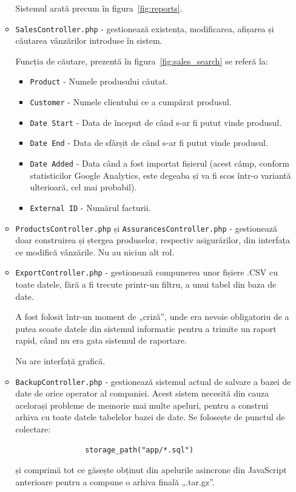\begin{itemize}
\begin{itemize}
				Sistemul arată precum în figura~\ref{fig:reports}.

				\item \verb|SalesController.php| - gestionează existența, modificarea, afișarea și căutarea vânzărilor introduse în sistem.

				Funcția de căutare, prezentă în figura~\ref{fig:sales_search} se referă la:
				\begin{itemize}
					\item \verb|Product| - Numele produsului căutat.
					\item \verb|Customer| - Numele clientului ce a cumpărat produsul.
					\item \verb|Date Start| - Data de început de când s-ar fi putut vinde produsul.
					\item \verb|Date End| - Data de sfârșit de când s-ar fi putut vinde produsul.
					\item \verb|Date Added| - Data când a fost importat fișierul (acest câmp, conform statisticilor Google Analytics, este degeaba și va fi scos într-o variantă ulterioară, cel mai probabil).
					\item \verb|External ID| - Numărul facturii.
				\end{itemize}
				\item \verb|ProductsController.php| și \verb|AssurancesController.php| - gestionează doar construirea și ștergea
					produselor, respectiv asigurărilor, din interfața ce modifică vânzările.
					Nu au niciun alt rol.
				\item \verb|ExportController.php| - gestionează compunerea unor fișiere .CSV cu toate datele, fără a fi trecute printr-un filtru, a unui tabel din baza de date.

				A fost folosit într-un moment de „criză”, unde era nevoie obligatoriu de a putea scoate datele din sistemul informatic pentru a trimite un raport rapid, când nu era gata sistemul de raportare.

				Nu are interfață grafică.

				\item \verb|BackupController.php| - gestionează sistemul actual de salvare a bazei de date de orice operator al companiei.
				Acest sistem necesită din cauza acelorași probleme de memorie mai multe apeluri, pentru a construi arhiva cu toate datele tabelelor bazei de date.
				Se folosește de punctul de colectare:
				\begin{verbatim}
				storage_path("app/*.sql")
				\end{verbatim}
				și comprimă tot ce găsește obținut din apelurile asincrone din JavaScript anterioare pentru a compune o arhiva finală „.tar.gz”.


\end{itemize}
\end{itemize}
